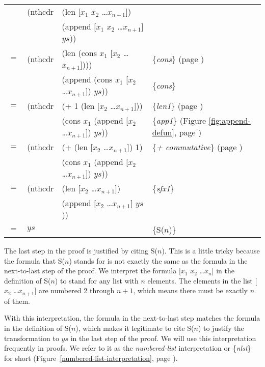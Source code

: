 \begin{center}
\begin{tabular}{llll}
    & (nthcdr & (len [$x_1$ $x_2$ \dots $x_{n+1}$])                 & \\
    &         & (append [$x_1$ $x_2$ \dots $x_{n+1}$] $ys$))        & \\
$=$ & (nthcdr & (len (cons $x_1$ [$x_2$ \dots $x_{n+1}$])))         & \{\emph{cons}\} (page \pageref{cons-axiom}) \\
    &         & (append (cons $x_1$ [$x_2$ \dots $x_{n+1}$]) $ys$)) & \{\emph{cons}\}                                \\
$=$ & (nthcdr & (+ 1 (len [$x_2$ \dots $x_{n+1}$]))                 & \{\emph{len1}\} (page \pageref{len-equations})       \\
    &         & (cons $x_1$ (append [$x_2$ \dots $x_{n+1}$]) $ys$)) & \{\emph{app1}\} (Figure \ref{fig:append-defun}, page \pageref{fig:append-defun})\\
$=$ & (nthcdr & (+ (len [$x_2$ \dots $x_{n+1}$]) 1)                 & \{\emph{+ commutative}\} (page \pageref{fig-02-01})  \\
    &         & (cons $x_1$ (append [$x_2$ \dots $x_{n+1}$]) $ys$)) &                                                      \\
$=$ & (nthcdr & (len [$x_2$ \dots $x_{n+1}$])                       & \{\emph{sfx1}\}                                      \\
    &         & (append [$x_2$ \dots $x_{n+1}$] $ys$))              &                                                      \\
$=$ & $ys$    &                                                     & \{S($n$)\}                                           \\
\end{tabular}
\end{center}

The last step in the proof is justified by citing S($n$).
This is a little tricky because the formula that S($n$)
stands for is not exactly the same as the formula in the next-to-last step of the proof.
We interpret the formula [$x_1$ $x_2$ \dots $x_n$] in the definition of S($n$)
to stand for any list with $n$ elements.
The elements in the list [$x_2$ \dots $x_{n+1}$] are numbered 2 through $n+1$,
which means there must be exactly $n$ of them.

With this interpretation, the formula in the next-to-last step
matches the formula in the definition of S($n$),
which makes it legitimate to cite S($n$) to justify
the transformation to $ys$ in the last step of the proof.
We will use this interpretation frequently in proofs.
We refer to it as the \emph{numbered-list} interpretation
or \{\emph{nlst}\} for short
(Figure~\ref{numbered-list-interpretation}, page \pageref{numbered-list-interpretation}).

